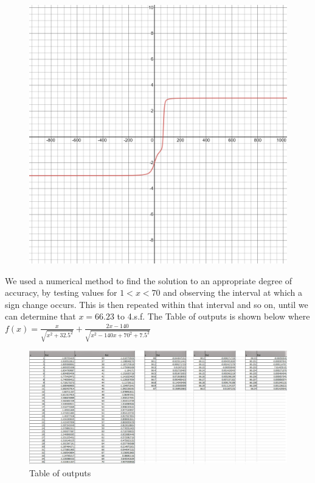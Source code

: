 \documentclass[12pt,a4paper]{article}
\begin{document}
\begin{figure}[ht]
    \centering
    \includegraphics[scale=0.08]{desmos-graph}
\end{figure}


We used a numerical method to find the solution to an appropriate degree of accuracy, by testing values for $1<x<70$ and observing the interval at which a sign change occurs. This is then repeated within that interval and so on, until we can determine that $x=66.23$ to 4.s.f. The Table of outputs is shown below where $f(x) = \frac{x}{\sqrt{x^2+32.5^2}}+\frac{2x-140}{\sqrt{x^2-140x+70^2+7.5^2}}$
\begin{figure}[ht!]
    \centering
    \includegraphics[scale=0.35]{TABLE.png}
    \captionsetup{labelformat=empty}
    \caption{Table of outputs}
\end{figure}
\end{document}
